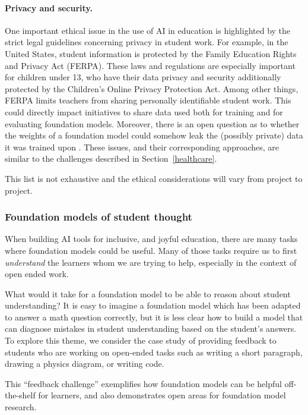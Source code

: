 \paragraph{Privacy and security.} One important ethical issue in the use of AI in education is highlighted by the strict legal guidelines concerning privacy in student work. For example, in the United States, student information is protected by the Family Education Rights and Privacy Act (FERPA). These laws and regulations are especially important for children under 13, who have their data privacy and security additionally protected by the Children's Online Privacy Protection Act. Among other things, FERPA limits teachers from sharing personally identifiable student work. This could directly impact initiatives to share data used both for training and for evaluating foundation models. Moreover, there is an open question as to whether the weights of a foundation model could somehow leak the (possibly private) data it was trained upon \cite{nasrPrivacy2018, songRemember2017}. These issues, and their corresponding approaches, are similar to the challenges described in  Section~\ref{healthcare}. 

This list is not exhaustive and the ethical considerations will vary from project to project.  

\subsubsection{Foundation models of student thought}

When building AI tools for inclusive, and joyful education, there are many tasks where foundation models could be useful. Many of those tasks require us to first \emph{understand} the learners whom we are trying to help, especially in the context of open ended work.

What would it take for a foundation model to be able to reason about student understanding? It is easy to imagine a foundation model which has been adapted to answer a math question correctly, but it is less clear how to build a model that can diagnose mistakes in student understanding based on the student's answers. To explore this theme, we consider the case study of providing feedback to students who are working on open-ended tasks such as writing a short paragraph, drawing a physics diagram, or writing code. 

This ``feedback challenge'' exemplifies how foundation models can be helpful off-the-shelf for learners, and also demonstrates open areas for foundation model research. 

